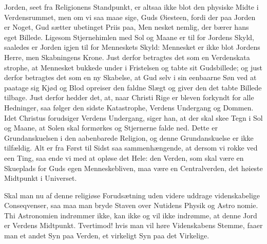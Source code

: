 \documentclass[12pt]{book}
\newcommand{\opage}[1]{\marginnote{\footnotesize\textit{[#1]}}}
\begin{document}
Jorden, seet fra Religionens Standpunkt, er altsaa
ikke blot den physiske Midte i Verdensrummet, men
om vi saa maae sige, Guds Øiesteen, fordi der paa
Jorden er Noget, Gud sætter ubetinget Priis paa, Men\-%
nesket nemlig, der bærer hans eget Billede. Ligesom
Stjernehimlen med Sol og Maane er til for Jordens
Skyld, saaledes er Jorden igjen til for Menneskets Skyld:
Mennesket er ikke blot Jordens Herre, men Skabningens
Krone. Just derfor betragtes det som en Verdenskata\-%
strophe, at Mennesket bukkede under i Fristelsen og
tabte sit Gudsbillede; og just derfor betragtes det som
en ny Skabelse, at Gud selv i sin eenbaarne Søn ved at
paatage sig Kjød og Blod opreiser den faldne Slægt og
giver den det tabte Billede tilbage. Just derfor hedder
\opage{65}\setcounter{footnote}{0}%
det, at, naar Christi Rige er bleven forkyndt for alle
Hedninger, saa følger den sidste Katastrophe, Verdens
Undergang og Dommen. Idet Christus forudsiger
Verdens Undergang, siger han, at der skal skee Tegn i
Sol og Maane, at Solen skal formørkes og Stjernerne
falde ned. Dette er Grundanskuelsen i den aabenbarede
Religion, og denne Grundanskuelse er ikke tilfældig.
Alt er fra Først til Sidst saa sammenhængende, at dersom
vi rokke ved een Ting, saa ende vi med at opløse det
Hele: den Verden, som skal være en Skueplads for Guds
egen Menneskebliven, maa være en Centralverden, det
høieste Midtpunkt i Universet.

Skal man nu af denne religiøse Forudsætning uden
videre uddrage videnskabelige Conseqvenser, saa maa
man bryde Staven over Nutidens Physik og Astro\-%
nomie. Thi Astronomien indrømmer ikke, kan ikke og
vil ikke indrømme, at denne Jord er Verdens Midtpunkt.
Tvertimod! hvis man vil høre Videnskabens Stemme,
faaer man et andet Syn paa Verden, et virkeligt Syn
paa det Virkelige.
\end{document}
